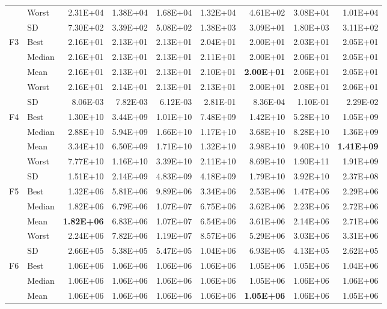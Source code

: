 \documentclass[algorithms,article,submit,moreauthors,pdftex]{Definitions/mdpi}
\newcommand{\bestval}[1]{\textbf{#1}}
\begin{document}
\begin{table}[p]
{\begin{tabular}{llrrrrrrr}
 & Worst & 2.31E+04 & 1.38E+04 & 1.68E+04 & 1.32E+04 & 4.61E+02 & 3.08E+04 & 1.01E+04 \\
 & SD & 7.30E+02 & 3.39E+02 & 5.08E+02 & 1.38E+03 & 3.09E+01 & 1.80E+03 & 3.11E+02 \\
\midrule
F3 & Best & 2.16E+01 & 2.13E+01 & 2.13E+01 & 2.04E+01 & 2.00E+01 & 2.03E+01 & 2.05E+01 \\
 & Median & 2.16E+01 & 2.13E+01 & 2.13E+01 & 2.11E+01 & 2.00E+01 & 2.06E+01 & 2.05E+01 \\
 & Mean & 2.16E+01 & 2.13E+01 & 2.13E+01 & 2.10E+01 & \bestval{2.00E+01} & 2.06E+01 & 2.05E+01 \\
 & Worst & 2.16E+01 & 2.14E+01 & 2.13E+01 & 2.13E+01 & 2.00E+01 & 2.08E+01 & 2.06E+01 \\
 & SD & 8.06E-03 & 7.82E-03 & 6.12E-03 & 2.81E-01 & 8.36E-04 & 1.10E-01 & 2.29E-02 \\
\midrule
F4 & Best & 1.30E+10 & 3.44E+09 & 1.01E+10 & 7.48E+09 & 1.42E+10 & 5.28E+10 & 1.05E+09 \\
 & Median & 2.88E+10 & 5.94E+09 & 1.66E+10 & 1.17E+10 & 3.68E+10 & 8.28E+10 & 1.36E+09 \\
 & Mean & 3.34E+10 & 6.50E+09 & 1.71E+10 & 1.32E+10 & 3.98E+10 & 9.40E+10 & \bestval{1.41E+09} \\
 & Worst & 7.77E+10 & 1.16E+10 & 3.39E+10 & 2.11E+10 & 8.69E+10 & 1.90E+11 & 1.91E+09 \\
 & SD & 1.51E+10 & 2.14E+09 & 4.83E+09 & 4.18E+09 & 1.79E+10 & 3.92E+10 & 2.37E+08 \\
\midrule
F5 & Best & 1.32E+06 & 5.81E+06 & 9.89E+06 & 3.34E+06 & 2.53E+06 & 1.47E+06 & 2.29E+06 \\
 & Median & 1.82E+06 & 6.79E+06 & 1.07E+07 & 6.75E+06 & 3.62E+06 & 2.23E+06 & 2.72E+06 \\
 & Mean & \bestval{1.82E+06} & 6.83E+06 & 1.07E+07 & 6.54E+06 & 3.61E+06 & 2.14E+06 & 2.71E+06 \\
 & Worst & 2.24E+06 & 7.82E+06 & 1.19E+07 & 8.57E+06 & 5.29E+06 & 3.03E+06 & 3.31E+06 \\
 & SD & 2.66E+05 & 5.38E+05 & 5.47E+05 & 1.04E+06 & 6.93E+05 & 4.13E+05 & 2.62E+05 \\
\midrule
F6 & Best & 1.06E+06 & 1.06E+06 & 1.06E+06 & 1.06E+06 & 1.05E+06 & 1.05E+06 & 1.04E+06 \\
 & Median & 1.06E+06 & 1.06E+06 & 1.06E+06 & 1.06E+06 & 1.05E+06 & 1.06E+06 & 1.06E+06 \\
 & Mean & 1.06E+06 & 1.06E+06 & 1.06E+06 & 1.06E+06 & \bestval{1.05E+06} & 1.06E+06 & 1.05E+06 \\

\end{tabular}}
\end{table}
\end{document}
